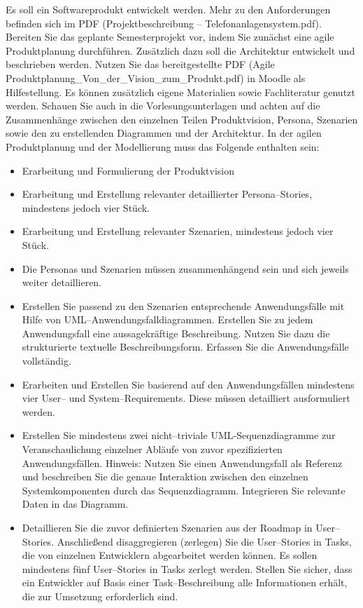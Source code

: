 Es soll ein Softwareprodukt entwickelt werden.
Mehr zu den Anforderungen befinden sich im PDF (Projektbeschreibung -- Telefonanlagensystem.pdf).
Bereiten Sie das geplante Semesterprojekt vor, indem Sie zunächst eine agile Produktplanung durchführen.
Zusätzlich dazu soll die Architektur entwickelt und beschrieben werden.
Nutzen Sie das bereitgestellte PDF (Agile Produktplanung\_Von\_der\_Vision\_zum\_Produkt.pdf) in Moodle als Hilfestellung.
Es können zusätzlich eigene Materialien sowie Fachliteratur genutzt werden.
Schauen Sie auch in die Vorlesungsunterlagen und achten auf die Zusammenhänge zwischen den einzelnen Teilen Produktvision, Persona, Szenarien sowie den zu erstellenden Diagrammen und der Architektur.
In der agilen Produktplanung und der Modellierung muss das Folgende enthalten sein:
\begin{itemize}
\item Erarbeitung und Formulierung der Produktvision
\item Erarbeitung und Erstellung relevanter detaillierter Persona--Stories, mindestens jedoch vier Stück.
\item Erarbeitung und Erstellung relevanter Szenarien, mindestens jedoch vier Stück.
\item Die Personas und Szenarien müssen zusammenhängend sein und sich jeweils weiter detaillieren.
\item Erstellen Sie passend zu den Szenarien entsprechende Anwendungsfälle mit Hilfe von UML--Anwendungsfalldiagrammen.
    Erstellen Sie zu jedem Anwendungsfall eine aussagekräftige Beschreibung.
    Nutzen Sie dazu die strukturierte textuelle Beschreibungsform.
    Erfassen Sie die Anwendungsfälle vollständig.
\item Erarbeiten und Erstellen Sie basierend auf den Anwendungsfällen mindestens vier User-- und System--Requirements.
    Diese müssen detailliert ausformuliert werden.
\item Erstellen Sie mindestens zwei nicht--triviale UML-Sequenzdiagramme zur Veranschaulichung einzelner Abläufe von zuvor spezifizierten Anwendungsfällen.
    Hinweis: Nutzen Sie einen Anwendungsfall als Referenz und beschreiben Sie die genaue Interaktion zwischen den einzelnen Systemkomponenten durch das Sequenzdiagramm.
    Integrieren Sie relevante Daten in das Diagramm.
\item Detaillieren Sie die zuvor definierten Szenarien aus der Roadmap in User--Stories.
    Anschließend disaggregieren (zerlegen) Sie die User--Stories in Tasks, die von einzelnen Entwicklern abgearbeitet werden können.
    Es sollen mindestens fünf User--Stories in Tasks zerlegt werden.
    Stellen Sie sicher, dass ein Entwickler auf Basis einer Task--Beschreibung alle Informationen erhält, die zur Umsetzung erforderlich sind.
\end{itemize}
